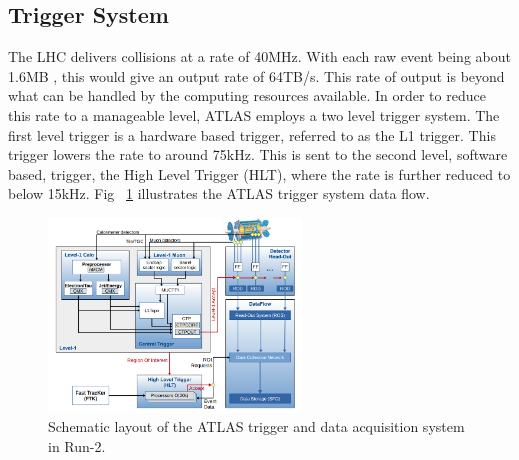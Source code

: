 \subsection{Trigger System}
The LHC delivers collisions at a rate of 40MHz. With each raw event being about 1.6MB \cite{Outreach:1457044}, this would give an output rate of 64TB/s. This rate of output is beyond what can be handled by the computing resources available. In order to reduce this rate to a manageable level, ATLAS employs a two level trigger system. The first level trigger is a hardware based trigger, referred to as the L1 trigger. This trigger lowers the rate to around 75kHz. This is sent to the second level, software based, trigger, the High Level Trigger (HLT), where the rate is further reduced to below 15kHz.  Fig ~\ref{fig:TDAQ} illustrates the ATLAS trigger system data flow.\linebreak

\begin{figure}[h]
\begin{center}
\includegraphics*[width=0.60\textwidth] {figures/run2TDAQ}%
\caption[Schematic layout of the ATLAS trigger and data acquisition system in Run-2.]{Schematic layout of the ATLAS trigger and data acquisition system in Run-2.\cite{Ruiz-Martinez:2133909}}
\label{fig:TDAQ}
\end{center}
\end{figure}

